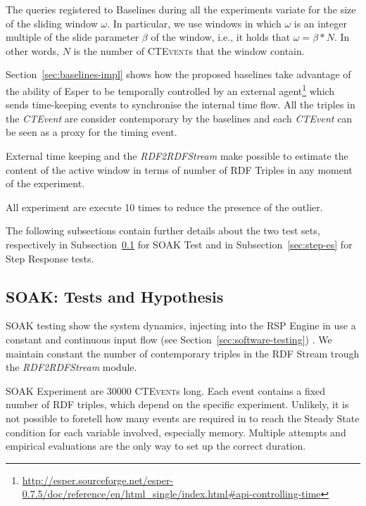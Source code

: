 The queries registered to \name Baselines during all the experiments variate for the size of the sliding window $\omega$. In particular, we use windows in which $\omega$ is an integer multiple of the slide parameter $\beta$ of the window, i.e., it holds that $\omega = \beta * N$. In other words, $N$ is the number of \textsc{CTEvent}s that the window contain. 

Section~\ref{sec:baselines-impl} shows how the proposed baselines take advantage of the ability of Esper to be temporally controlled by an external agent\footnote{\url{http://esper.sourceforge.net/esper-0.7.5/doc/reference/en/html_single/index.html#api-controlling-time}} which sends time-keeping events to synchronise the internal time flow. All the triples in the \textit{CTEvent} are consider contemporary by the baselines and each \textit{CTEvent} can be seen as a proxy for the timing event. 

External time keeping and the \textit{RDF2RDFStream} make possible to estimate the content of the active window in terms of number of RDF Triples in any moment of the experiment.

All experiment are execute 10 times to reduce the presence of the outlier.

The following subsections contain further details about the two test sets, respectively in Subsection~\ref{sec:soak-es} for SOAK Test and in Subsection~\ref{sec:step-es} for Step Response tests.

\subsection{SOAK: Tests and Hypothesis}\label{sec:soak-es}

SOAK testing show the system dynamics, injecting into the RSP Engine in use a constant and continuous input flow (see Section~\ref{sec:software-testing}) . We maintain constant the number of contemporary triples in the RDF Stream trough the \textit{RDF2RDFStream} module. %

SOAK Experiment are 30000 \textsc{CTEvent}s long. Each event contains a fixed number of RDF triples, which depend on the specific experiment. Unlikely, it is not possible to foretell how many events are required in to reach the Steady State condition for each variable involved, especially memory. Multiple attempts and empirical evaluations are the only way to set up the correct duration.

